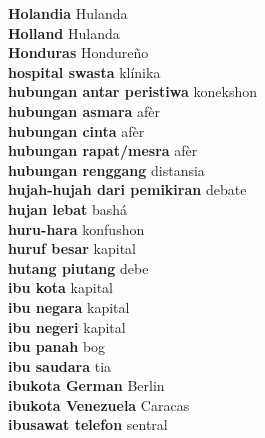 \textbf{ Holandia  } Hulanda \\
\textbf{ Holland  } Hulanda \\
\textbf{ Honduras  } Hondureño \\
\textbf{ hospital swasta  } klínika \\
\textbf{ hubungan antar peristiwa  } konekshon \\
\textbf{ hubungan asmara  } afèr \\
\textbf{ hubungan cinta  } afèr \\
\textbf{ hubungan rapat/mesra  } afèr \\
\textbf{ hubungan renggang  } distansia \\
\textbf{ hujah-hujah dari pemikiran  } debate \\
\textbf{ hujan lebat  } bashá \\
\textbf{ huru-hara  } konfushon \\
\textbf{ huruf besar  } kapital \\
\textbf{ hutang piutang  } debe \\
\textbf{ ibu kota  } kapital \\
\textbf{ ibu negara  } kapital \\
\textbf{ ibu negeri  } kapital \\
\textbf{ ibu panah  } bog \\
\textbf{ ibu saudara  } tia \\
\textbf{ ibukota German  } Berlin \\
\textbf{ ibukota Venezuela  } Caracas \\
\textbf{ ibusawat telefon  } sentral \\
